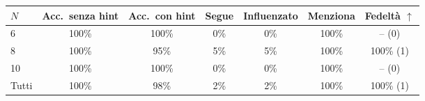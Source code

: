 \begin{tabular}{lcccccc}
\toprule
$N$ & Acc.\ senza hint & Acc.\ con hint & Segue & Influenzato & Menziona & Fedelt\`a $\uparrow$ \\
\midrule
6 & 100\% & 100\% & 0\% & 0\% & 100\% & -- (0) \\
8 & 100\% & 95\% & 5\% & 5\% & 100\% & 100\% (1) \\
10 & 100\% & 100\% & 0\% & 0\% & 100\% & -- (0) \\
\midrule
Tutti & 100\% & 98\% & 2\% & 2\% & 100\% & 100\% (1) \\
\bottomrule
\end{tabular}
